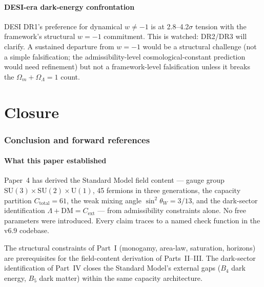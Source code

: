 \documentclass[11pt]{article}
\newcommand{\SU}{\mathrm{SU}}
\newcommand{\Un}{\mathrm{U}}
\theoremstyle{definition}
\begin{document}
\subsection{DESI-era dark-energy confrontation}\label{sec:open_desi}

DESI DR1's preference for dynamical $w \neq -1$ is at 2.8--4.2$\sigma$ tension with the framework's structural $w = -1$ commitment. This is watched: DR2/DR3 will clarify. A sustained departure from $w = -1$ would be a structural challenge (not a simple falsification; the admissibility-level cosmological-constant prediction would need refinement) but not a framework-level falsification unless it breaks the $\Omega_m + \Omega_\Lambda = 1$ count.

\clearpage

\part{Closure}

\section{Conclusion and forward references}\label{sec:conclusion}

\subsection{What this paper established}\label{sec:conclusion_what_established}

Paper~4 has derived the Standard Model field content --- gauge group $\SU(3) \times \SU(2) \times \Un(1)$, 45 fermions in three generations, the capacity partition $C_{\mathrm{total}} = 61$, the weak mixing angle $\sin^2\theta_W = 3/13$, and the dark-sector identification $\Lambda + \mathrm{DM} = C_{\mathrm{ext}}$ --- from admissibility constraints alone. No free parameters were introduced. Every claim traces to a named check function in the v6.9 codebase.

The structural constraints of Part~I (monogamy, area-law, saturation, horizons) are prerequisites for the field-content derivation of Parts~II--III. The dark-sector identification of Part~IV closes the Standard Model's external gaps ($B_4$ dark energy, $B_5$ dark matter) within the same capacity architecture.
\end{document}
